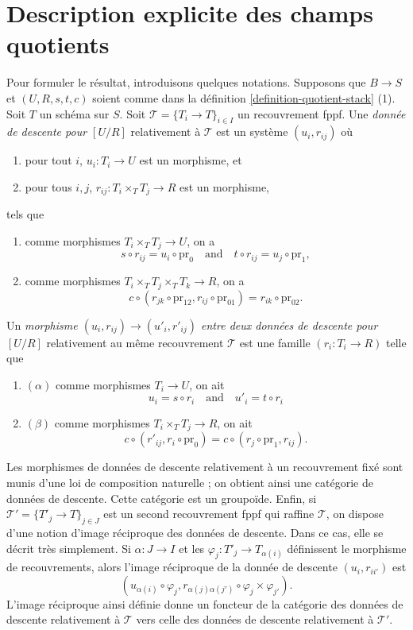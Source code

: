 \section{Description explicite des champs quotients}
\label{section-explicit-quotient-stacks}

\noindent
Pour formuler le résultat, introduisons quelques notations. Supposons que $B \to S$ et $(U, R, s, t, c)$ soient comme dans la définition \ref{definition-quotient-stack} (1). Soit $T$ un schéma sur $S$. Soit $\mathcal{T} = \{T_i \to T\}_{i \in I}$ un recouvrement fppf. Une {\it donnée de descente pour $[U/R]$} relativement à $\mathcal{T}$ est un système $(u_i, r_{ij})$ où
\begin{enumerate}
\item pour tout $i$, $u_i : T_i \to U$ est un morphisme, et
\item pour tous $i, j$, $r_{ij} : T_i \times_T T_j \to R$ est un morphisme,
\end{enumerate}
tels que
\begin{enumerate}
\item [(a)] comme morphismes $T_i \times_T T_j \to U$, on a
$$
s \circ r_{ij} = u_i \circ \text{pr}_0
\quad\text{and}\quad
t \circ r_{ij} = u_j \circ \text{pr}_1,
$$
\item [(b)] comme morphismes $T_i \times_T T_j \times_T T_k \to R$, on a
$$
c \circ (r_{jk} \circ \text{pr}_{12}, r_{ij} \circ \text{pr}_{01})
= r_{ik} \circ \text{pr}_{02}.
$$
\end{enumerate}
Un {\it morphisme $(u_i, r_{ij}) \to (u'_i, r'_{ij})$ entre deux données de descente pour $[U/R]$} relativement au même recouvrement $\mathcal{T}$ est une famille $(r_i : T_i \to R)$ telle que
\begin{enumerate}
\item [] $(\alpha)$ comme morphismes $T_i \to U$, on ait
$$
u_i = s \circ r_i
\quad\text{and}\quad
u'_i = t \circ r_i
$$
\item [] $(\beta)$ comme morphismes $T_i \times_T T_j \to R$, on ait
$$
c \circ (r'_{ij}, r_i \circ \text{pr}_0)
=
c \circ (r_j \circ \text{pr}_1, r_{ij}).
$$
\end{enumerate}
Les morphismes de données de descente relativement à un recouvrement fixé sont munis d'une loi de composition naturelle ; on obtient ainsi une catégorie de données de descente. Cette catégorie est un groupoïde. Enfin, si $\mathcal{T}' = \{T'_j \to T\}_{j \in J}$ est un second recouvrement fppf qui raffine $\mathcal{T}$, on dispose d'une notion d'image réciproque des données de descente. Dans ce cas, elle se décrit très simplement. Si $\alpha : J \to I$ et les $\varphi_j : T'_j \to T_{\alpha(i)}$ définissent le morphisme de recouvrements, alors l'image réciproque de la donnée de descente $(u_i, r_{ii'})$ est
$$
(u_{\alpha(i)} \circ \varphi_j,
r_{\alpha(j)\alpha(j')} \circ \varphi_j \times \varphi_{j'}).
$$
L'image réciproque ainsi définie donne un foncteur de la catégorie des données de descente relativement à $\mathcal{T}$ vers celle des données de descente relativement à $\mathcal{T}'$.

